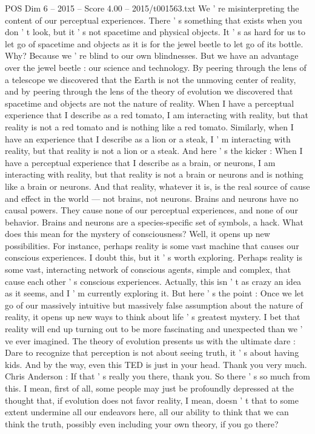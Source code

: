 \begin{textsample}{POS Dim 6 – 2015 – Score 4.00 – 2015/t001563.txt}
We ' re misinterpreting the content of our perceptual experiences.
There ' s something that exists when you don ' t look, but it ' s not spacetime and physical objects.
It ' s as hard for us to let go of spacetime and objects as it is for the jewel beetle to let go of its bottle.
Why?
Because we ' re blind to our own blindnesses.
But we have an advantage over the jewel beetle : our science and technology.
By peering through the lens of a telescope we discovered that the Earth is not the unmoving center of reality, and by peering through the lens of the theory of evolution we discovered that spacetime and objects are not the nature of reality.
When I have a perceptual experience that I describe as a red tomato, I am interacting with reality, but that reality is not a red tomato and is nothing like a red tomato.
Similarly, when I have an experience that I describe as a lion or a steak, I ' m interacting with reality, but that reality is not a lion or a steak.
And here ' s the kicker : When I have a perceptual experience that I describe as a brain, or neurons, I am interacting with reality, but that reality is not a brain or neurons and is nothing like a brain or neurons.
And that reality, whatever it is, is the real source of cause and effect in the world — not brains, not neurons.
Brains and neurons have no causal powers.
They cause none of our perceptual experiences, and none of our behavior.
Brains and neurons are a species-specific set of symbols, a hack.
What does this mean for the mystery of consciousness?
Well, it opens up new possibilities.
For instance, perhaps reality is some vast machine that causes our conscious experiences.
I doubt this, but it ' s worth exploring.
Perhaps reality is some vast, interacting network of conscious agents, simple and complex, that cause each other ' s conscious experiences.
Actually, this isn ' t as crazy an idea as it seems, and I ' m currently exploring it.
But here ' s the point : Once we let go of our massively intuitive but massively false assumption about the nature of reality, it opens up new ways to think about life ' s greatest mystery.
I bet that reality will end up turning out to be more fascinating and unexpected than we ' ve ever imagined.
The theory of evolution presents us with the ultimate dare : Dare to recognize that perception is not about seeing truth, it ' s about having kids.
And by the way, even this TED is just in your head.
Thank you very much.
Chris Anderson : If that ' s really you there, thank you.
So there ' s so much from this.
I mean, first of all, some people may just be profoundly depressed at the thought that, if evolution does not favor reality, I mean, doesn ' t that to some extent undermine all our endeavors here, all our ability to think that we can think the truth, possibly even including your own theory, if you go there?

\end{textsample}
